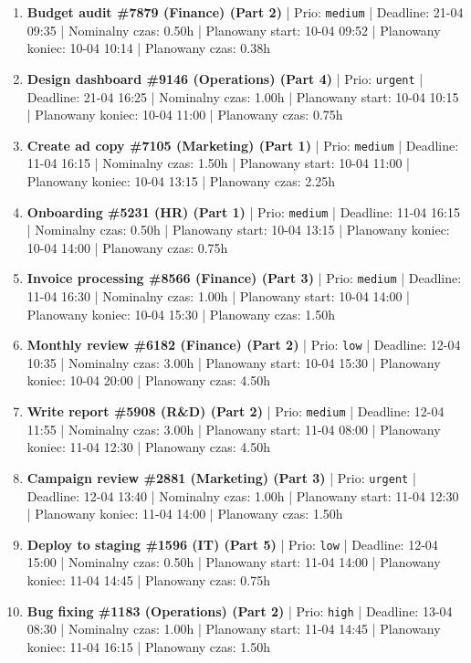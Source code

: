 {\begin{enumerate}
  \item [\textbf{14644}] \textbf{Budget audit \#7879 (Finance) (Part 2)} | Prio: \texttt{medium} | Deadline: 21-04 09:35 | Nominalny czas: 0.50h | Planowany start: 10-04 09:52 | Planowany koniec: 10-04 10:14 | Planowany czas: 0.38h
  \item [\textbf{14606}] \textbf{Design dashboard \#9146 (Operations) (Part 4)} | Prio: \texttt{urgent} | Deadline: 21-04 16:25 | Nominalny czas: 1.00h | Planowany start: 10-04 10:15 | Planowany koniec: 10-04 11:00 | Planowany czas: 0.75h
  \item [\textbf{14650}] \textbf{Create ad copy \#7105 (Marketing) (Part 1)} | Prio: \texttt{medium} | Deadline: 11-04 16:15 | Nominalny czas: 1.50h | Planowany start: 10-04 11:00 | Planowany koniec: 10-04 13:15 | Planowany czas: 2.25h
  \item [\textbf{14671}] \textbf{Onboarding \#5231 (HR) (Part 1)} | Prio: \texttt{medium} | Deadline: 11-04 16:15 | Nominalny czas: 0.50h | Planowany start: 10-04 13:15 | Planowany koniec: 10-04 14:00 | Planowany czas: 0.75h
  \item [\textbf{14675}] \textbf{Invoice processing \#8566 (Finance) (Part 3)} | Prio: \texttt{medium} | Deadline: 11-04 16:30 | Nominalny czas: 1.00h | Planowany start: 10-04 14:00 | Planowany koniec: 10-04 15:30 | Planowany czas: 1.50h
  \item [\textbf{14690}] \textbf{Monthly review \#6182 (Finance) (Part 2)} | Prio: \texttt{low} | Deadline: 12-04 10:35 | Nominalny czas: 3.00h | Planowany start: 10-04 15:30 | Planowany koniec: 10-04 20:00 | Planowany czas: 4.50h
  \item [\textbf{14674}] \textbf{Write report \#5908 (R\&D) (Part 2)} | Prio: \texttt{medium} | Deadline: 12-04 11:55 | Nominalny czas: 3.00h | Planowany start: 11-04 08:00 | Planowany koniec: 11-04 12:30 | Planowany czas: 4.50h
  \item [\textbf{14599}] \textbf{Campaign review \#2881 (Marketing) (Part 3)} | Prio: \texttt{urgent} | Deadline: 12-04 13:40 | Nominalny czas: 1.00h | Planowany start: 11-04 12:30 | Planowany koniec: 11-04 14:00 | Planowany czas: 1.50h
  \item [\textbf{14692}] \textbf{Deploy to staging \#1596 (IT) (Part 5)} | Prio: \texttt{low} | Deadline: 12-04 15:00 | Nominalny czas: 0.50h | Planowany start: 11-04 14:00 | Planowany koniec: 11-04 14:45 | Planowany czas: 0.75h
  \item [\textbf{14613}] \textbf{Bug fixing \#1183 (Operations) (Part 2)} | Prio: \texttt{high} | Deadline: 13-04 08:30 | Nominalny czas: 1.00h | Planowany start: 11-04 14:45 | Planowany koniec: 11-04 16:15 | Planowany czas: 1.50h

\end{enumerate}}
